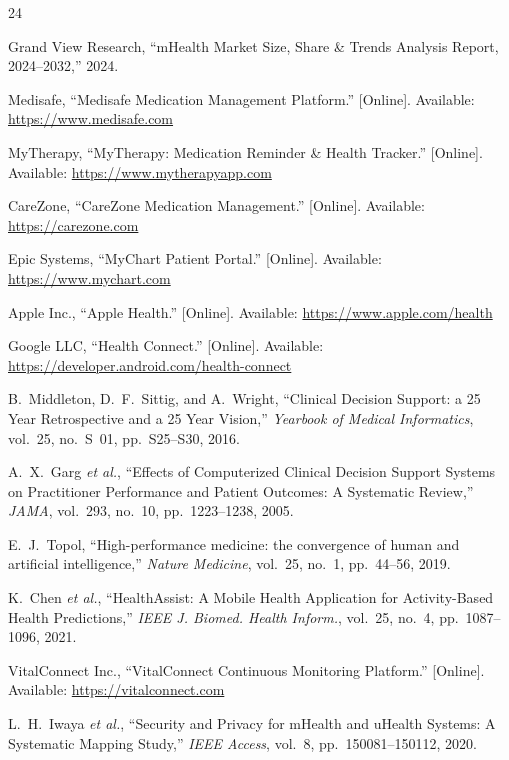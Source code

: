 \documentclass[journal,onecolumn,web]{ieeecolor}
\begin{document}
\begin{thebibliography}{24}

Grand View Research, ``mHealth Market Size, Share
\& Trends Analysis Report, 2024--2032,'' 2024.

Medisafe, ``Medisafe Medication Management
Platform.'' [Online]. Available:
\url{https://www.medisafe.com}

MyTherapy, ``MyTherapy: Medication Reminder \&
Health Tracker.'' [Online]. Available:
\url{https://www.mytherapyapp.com}

CareZone, ``CareZone Medication Management.''
[Online]. Available: \url{https://carezone.com}

Epic Systems, ``MyChart Patient Portal.'' [Online].
Available: \url{https://www.mychart.com}

Apple Inc., ``Apple Health.'' [Online]. Available:
\url{https://www.apple.com/health}

Google LLC, ``Health Connect.'' [Online]. Available:
\url{https://developer.android.com/health-connect}

B.~Middleton, D.~F.~Sittig, and A.~Wright,
``Clinical Decision Support: a 25 Year Retrospective
and a 25 Year Vision,'' {\it Yearbook of Medical
Informatics}, vol.~25, no.~S~01, pp.~S25--S30, 2016.

A.~X.~Garg {\it et al.}, ``Effects of Computerized
Clinical Decision Support Systems on Practitioner
Performance and Patient Outcomes: A Systematic
Review,'' {\it JAMA}, vol.~293, no.~10,
pp.~1223--1238, 2005.

E.~J.~Topol, ``High-performance medicine: the
convergence of human and artificial intelligence,''
{\it Nature Medicine}, vol.~25, no.~1, pp.~44--56,
2019.

K.~Chen {\it et al.}, ``HealthAssist: A Mobile
Health Application for Activity-Based Health
Predictions,'' {\it IEEE J. Biomed. Health Inform.},
vol.~25, no.~4, pp.~1087--1096, 2021.

VitalConnect Inc., ``VitalConnect Continuous
Monitoring Platform.'' [Online]. Available:
\url{https://vitalconnect.com}

L.~H.~Iwaya {\it et al.}, ``Security and Privacy
for mHealth and uHealth Systems: A Systematic
Mapping Study,'' {\it IEEE Access}, vol.~8,
pp.~150081--150112, 2020.


\end{thebibliography}
\end{document}
